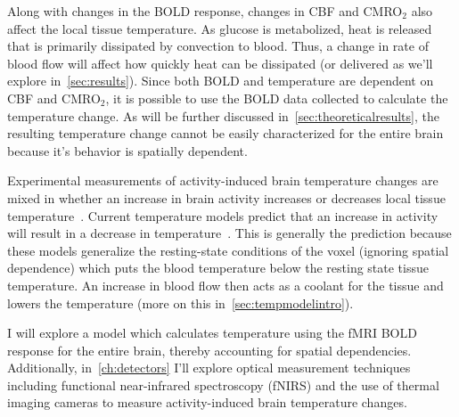 Along with changes in the BOLD response, changes in CBF and CMRO$_2$ also affect the local tissue temperature. As glucose is metabolized, heat is released that is primarily dissipated by convection to blood.  Thus, a change in rate of blood flow will affect how quickly heat can be dissipated (or delivered as we'll explore in~\cref{sec:results}).  Since both BOLD and temperature are dependent on CBF and CMRO$_2$, it is possible to use the BOLD data collected to calculate the temperature change. As will be further discussed in~\cref{sec:theoreticalresults}, the resulting temperature change cannot be easily characterized for the entire brain because it's behavior is spatially dependent.

Experimental measurements of activity-induced brain temperature changes are mixed in whether an increase in brain activity increases or decreases local tissue temperature~\citep{mcelligott,kiyatkin,zeschke,george,tachibana}. Current temperature models predict that an increase in activity will result in a decrease in temperature~\citep{sotero2011,yablonskiy,trubel}.  This is generally the prediction because these models generalize the resting-state conditions of the voxel (ignoring spatial dependence) which puts the blood temperature below the resting state tissue temperature.  An increase in blood flow then acts as a coolant for the tissue and lowers the temperature (more on this in~\cref{sec:tempmodelintro}).

I will explore a model which calculates temperature using the fMRI BOLD response for the entire brain, thereby accounting for spatial dependencies.  Additionally, in~\cref{ch:detectors} I'll explore optical measurement techniques including functional near-infrared spectroscopy (fNIRS) and the use of thermal imaging cameras to measure activity-induced brain temperature changes.